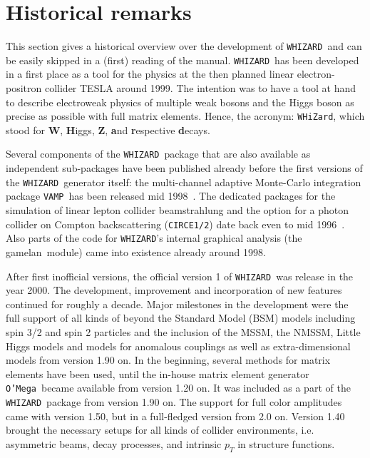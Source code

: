 \documentclass[12pt]{book}
\newcommand{\ttt}[1]{\texttt{#1}}
\newcommand{\whizard}{\ttt{WHIZARD}}
\newcommand{\oMega}{\ttt{O'Mega}}
\newcommand{\vamp}{\ttt{VAMP}}
\newcommand{\gamelan}{\textsf{gamelan}}
\begin{document}

\section{Historical remarks}

This section gives a historical overview over the development of
\whizard\ and can be easily skipped in a (first) reading of the
manual. \whizard\ has been developed in a first place as a tool for
the physics at the then planned linear electron-positron collider
TESLA around 1999. The intention was to have a tool at hand to
describe electroweak physics of multiple weak bosons and the Higgs
boson as precise as possible with full matrix elements. Hence, the
acronym: \ttt{WHiZard}, which stood for $\mathbf{W}$, {\bf H}iggs,
$\mathbf{Z}$, {\bf a}nd {\bf r}espective {\bf d}ecays.

Several components of the \whizard\ package that are also available as
independent sub-packages have been published already before the first
versions of the \whizard\ generator itself: the multi-channel adaptive
Monte-Carlo integration package \vamp\ has been released mid
1998~\cite{VAMP}. The dedicated packages for the simulation of linear
lepton collider beamstrahlung and the option for a photon collider on
Compton backscattering (\ttt{CIRCE1/2}) date back even to mid
1996~\cite{CIRCE}. Also parts of the code for \whizard's internal
graphical analysis (the \gamelan\ module) came into existence already
around 1998.

After first inofficial versions, the official version 1 of \whizard\
was release in the year 2000. The development, improvement and
incorporation of new features continued for roughly a decade. Major
milestones in the development were the full support of all kinds of
beyond the Standard Model (BSM) models including spin 3/2 and spin 2
particles and the inclusion of the MSSM, the NMSSM, Little Higgs
models and models for anomalous couplings as well as extra-dimensional
models from version 1.90 on. In the beginning, several methods for
matrix elements have been used, until the in-house matrix element
generator \oMega\ became available from version 1.20 on. It was
included as a part of the \whizard\ package from version 1.90 on. The
support for full color amplitudes came with version 1.50, but in a
full-fledged version from 2.0 on. Version 1.40 brought the necessary
setups for all kinds of collider environments, i.e. asymmetric beams,
decay processes, and intrinsic $p_T$ in structure functions.
\end{document}
